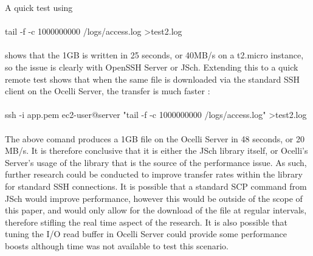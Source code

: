 \documentclass{llncs}
\begin{document}
A quick test using
\\
\\
tail -f -c 1000000000 /logs/access.log \textgreater  test2.log
\\
\\
shows that the 1GB is written in 25 seconds, or 40MB/s on a t2.micro instance, so the issue is clearly with OpenSSH Server or JSch. Extending this to a quick remote test shows that when the same file is downloaded via the standard SSH client on the Ocelli Server, the transfer is much faster :
\\
\\
ssh -i app.pem ec2-user@server  "tail -f -c 1000000000 /logs/access.log" \textgreater  test2.log
\\
\\
The above comand produces a 1GB file on the Ocelli Server in 48 seconds, or 20 MB/s. It is therefore conclusive that it is either the JSch library itself, or Ocelli's Server's usage of the library that is the source of the performance issue. As such, further research could be conducted to improve transfer rates within the library for standard SSH connections. It is possible that a standard SCP command from JSch would improve performance, however this would be outside of the scope of this paper, and would only allow for the download of the file at regular intervals, therefore stifling the real time aspect of the research. It is also possible that tuning the I/O read buffer in Ocelli Server could provide some performance boosts although time was not available to test this scenario.
\end{document}

